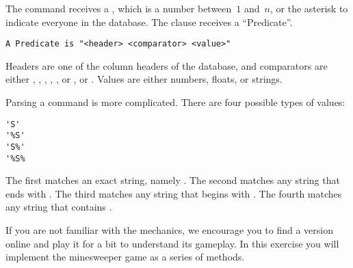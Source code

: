 The  command receives a , which is a number between~$1$ and~$n$, or the asterisk to indicate everyone in the database. The  clause receives a ``Predicate''.

\begin{verbatim}
A Predicate is "<header> <comparator> <value>"
\end{verbatim}

Headers are one of the column headers of the database, and comparators are either \ttt{=}, \ttt{!=}, \ttt{<}, \ttt{<=}, \ttt{>}, or \ttt{>=}, or . Values are either numbers, floats, or strings. 

Parsing a  command is more complicated. There are four possible types of values: 

\begin{verbatim}
'S'
'%S'
'S%'
'%S%
\end{verbatim}

The first matches an exact string, namely . The second matches any string that ends with . The third matches any string that begins with . The fourth matches any string that contains . 

If you are not familiar with the mechanics, we encourage you to find a version online and play it for a bit to understand its gameplay.
In this exercise you will implement the minesweeper game as a series of methods.

